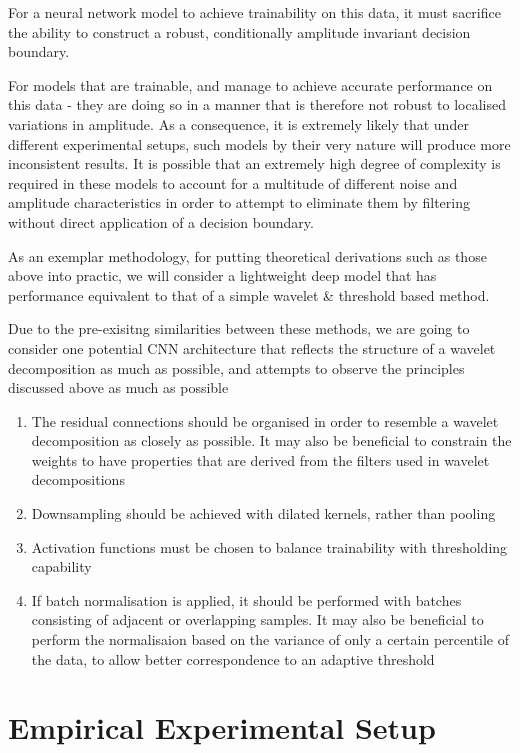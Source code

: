 \documentclass[9pt,conference]{IEEEtran}
\begin{document}
For a neural network model to achieve trainability on this data, it must sacrifice the ability to construct a robust, conditionally amplitude invariant decision boundary. 

For models that are trainable, and manage to achieve accurate performance on this data - they are doing so in a manner that is therefore not robust to localised variations in amplitude. As a consequence, it is extremely likely that under different experimental setups, such models by their very nature will produce more inconsistent results. It is possible that an extremely high degree of complexity is required in these models to account for a multitude of different noise and amplitude characteristics in order to attempt to eliminate them by filtering without direct application of a decision boundary. 

As an exemplar methodology, for putting theoretical derivations such as those above into practic, we will consider a lightweight deep model that has performance equivalent to that of a simple wavelet \& threshold based method.

Due to the pre-exisitng similarities between these methods, we are going to consider one potential CNN architecture that reflects the structure of a wavelet decomposition as much as possible, and attempts to observe the principles discussed above as much as possible

\begin{enumerate}
    \item The residual connections should be organised in order to resemble a wavelet decomposition as closely as possible. It may also be beneficial to constrain the weights to have properties that are derived from the filters used in wavelet decompositions
    \item Downsampling should be achieved with dilated kernels, rather than pooling
    \item Activation functions must be chosen to balance trainability with thresholding capability
    \item If batch normalisation is applied, it should be performed with batches consisting of adjacent or overlapping samples. It may also be beneficial to perform the normalisaion based on the variance of only a certain percentile of the data, to allow better correspondence to an adaptive threshold
\end{enumerate}
\section{Empirical Experimental Setup}
\end{document}
